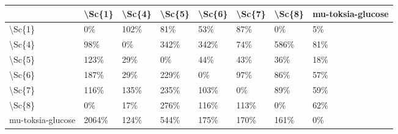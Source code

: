 \begin{tabular}{llllllll}
\toprule
{} & \textbackslash Sc\{1\} & \textbackslash Sc\{4\} & \textbackslash Sc\{5\} & \textbackslash Sc\{6\} & \textbackslash Sc\{7\} & \textbackslash Sc\{8\} & mu-toksia-glucose \\
\midrule
\textbackslash Sc\{1\}            &     0\% &   102\% &    81\% &    53\% &    87\% &     0\% &                5\% \\
\textbackslash Sc\{4\}            &    98\% &     0\% &   342\% &   342\% &    74\% &   586\% &               81\% \\
\textbackslash Sc\{5\}            &   123\% &    29\% &     0\% &    44\% &    43\% &    36\% &               18\% \\
\textbackslash Sc\{6\}            &   187\% &    29\% &   229\% &     0\% &    97\% &    86\% &               57\% \\
\textbackslash Sc\{7\}            &   116\% &   135\% &   235\% &   103\% &     0\% &    89\% &               59\% \\
\textbackslash Sc\{8\}            &     0\% &    17\% &   276\% &   116\% &   113\% &     0\% &               62\% \\
mu-toksia-glucose &  2064\% &   124\% &   544\% &   175\% &   170\% &   161\% &                0\% \\
\bottomrule
\end{tabular}
